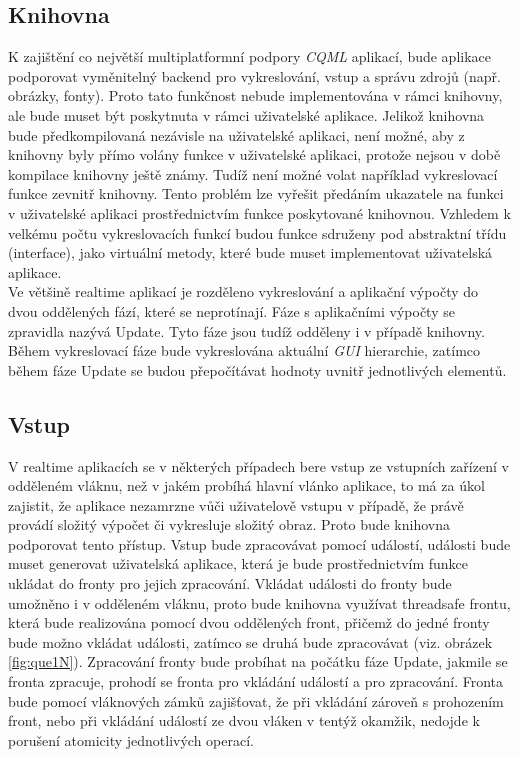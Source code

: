 \documentclass[11pt,twoside,a4paper]{book}
\begin{document}
{{\begin{ttemize}
{{\section{\label{SEC:libI}Knihovna}
K zajištění co největší multiplatformní podpory \textit{CQML} aplikací, bude aplikace podporovat vyměnitelný backend pro vykreslování, vstup a správu zdrojů (např. obrázky, fonty). Proto tato funkčnost nebude implementována v rámci knihovny, ale bude muset být poskytnuta v rámci uživatelské aplikace. 
Jelikož knihovna bude předkompilovaná nezávisle na uživatelské aplikaci, není možné, aby z knihovny byly přímo volány funkce v uživatelské aplikaci, protože nejsou v době kompilace knihovny ještě známy. Tudíž není možné volat například vykreslovací funkce zevnitř knihovny. Tento problém lze vyřešit předáním ukazatele na funkci v uživatelské aplikaci prostřednictvím funkce poskytované knihovnou. Vzhledem k velkému počtu vykreslovacích funkcí budou funkce sdruženy pod abstraktní třídu (interface), jako virtuální metody, které bude muset implementovat uživatelská aplikace.\\

Ve většině realtime aplikací je rozděleno vykreslování a aplikační výpočty do dvou oddělených fází, které se neprotínají. Fáze s aplikačními výpočty se zpravidla nazývá Update. Tyto fáze jsou tudíž odděleny i v případě knihovny. Během vykreslovací fáze bude vykreslována aktuální \textit{GUI} hierarchie, zatímco během fáze Update se budou přepočítávat hodnoty uvnitř jednotlivých elementů.\\

\subsection {Vstup}
V realtime aplikacích se v některých případech bere vstup ze vstupních zařízení v odděleném vláknu, než v jakém probíhá hlavní vlánko aplikace, to má za úkol zajistit, že aplikace nezamrzne vůči uživatelově vstupu v případě, že právě provádí složitý výpočet či vykresluje složitý obraz. Proto bude knihovna podporovat tento přístup. Vstup bude zpracovávat pomocí událostí, události bude muset generovat uživatelská aplikace, která je bude prostřednictvím funkce ukládat do fronty pro jejich zpracování. Vkládat události do fronty bude umožněno i v odděleném vláknu, proto bude knihovna využívat threadsafe frontu, která bude realizována pomocí dvou oddělených front, přičemž do jedné fronty bude možno vkládat události, zatímco se druhá bude zpracovávat (viz. obrázek \ref{fig:que1N}). Zpracování fronty bude probíhat na počátku fáze Update, jakmile se fronta zpracuje, prohodí se fronta pro vkládání událostí a pro zpracování. Fronta bude pomocí vláknových zámků zajišťovat, že při vkládání zároveň s prohozením front, nebo při vkládání událostí ze dvou vláken v tentýž okamžik, nedojde k porušení atomicity jednotlivých operací.\\

}}
\end{ttemize}}}
\end{document}
